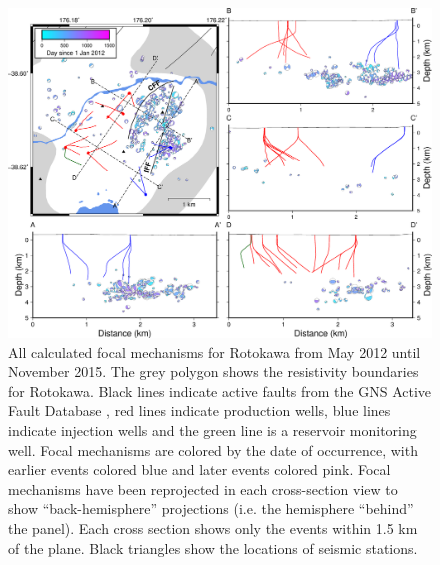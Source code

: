 \begin{figure}[h!]
\begin{center}
\includegraphics[width=1.00\columnwidth]{Chapter_5_FMs/figures/merc_Rot_GC_focmecs/merc_Rot_GC_focmecs}
\caption[Rotokawa focal mechanism solutions]{{
All calculated focal mechanisms for Rotokawa from May 2012 until
November 2015. The grey polygon shows the resistivity boundaries for
Rotokawa. Black lines indicate active faults from the GNS Active Fault
Database \citep{AFDB}, red lines indicate
production wells, blue lines indicate injection wells and the green line
is a reservoir monitoring well. Focal mechanisms are colored by the date
of occurrence, with earlier events colored blue and later events colored
pink. Focal mechanisms have been reprojected in each cross-section view
to show ``back-hemisphere'' projections (i.e. the hemisphere ``behind''
the panel). Each cross section shows only the events within 1.5 km of
the plane. Black triangles show the locations of seismic stations.
{\label{817909}}%
}}
\end{center}
\end{figure}

